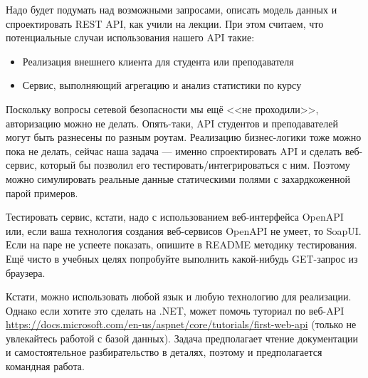 \documentclass[a5paper]{article}
\begin{document}
Надо будет подумать над возможными запросами, описать модель данных и спроектировать REST API, как учили на лекции. При этом считаем, что потенциальные случаи использования нашего API такие:


\begin{itemize}
    \item Реализация внешнего клиента для студента или преподавателя
    \item Сервис, выполняющий агрегацию и анализ статистики по курсу
\end{itemize}

Поскольку вопросы сетевой безопасности мы ещё <<не проходили>>, авторизацию можно не делать. Опять-таки, API студентов и преподавателей могут быть разнесены по разным роутам. Реализацию бизнес-логики тоже можно пока не делать, сейчас наша задача --- именно спроектировать API и сделать веб-сервис, который бы позволил его тестировать/интегрироваться с ним. Поэтому можно симулировать реальные данные статическими полями с захардкоженной парой примеров.

Тестировать сервис, кстати, надо с использованием веб-интерфейса OpenAPI или, если ваша технология создания веб-сервисов OpenAPI не умеет, то SoapUI. Если на паре не успеете показать, опишите в README методику тестирования. Ещё чисто в учебных целях попробуйте выполнить какой-нибудь GET-запрос из браузера.

Кстати, можно использовать любой язык и любую технологию для реализации. Однако если хотите это сделать на .NET, может помочь туториал по веб-API \url{https://docs.microsoft.com/en-us/aspnet/core/tutorials/first-web-api} (только не увлекайтесь работой с базой данных). Задача предполагает чтение документации и самостоятельное разбирательство в деталях, поэтому и предполагается командная работа.
\end{document}
